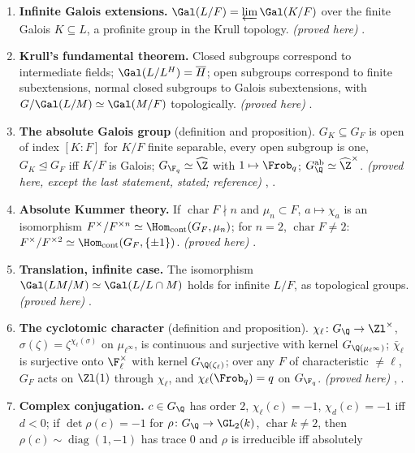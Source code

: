 \begin{enumerate}[label=\textbf{\thechapter.\arabic*}]
.
\item \textbf{Infinite Galois extensions.} $\Gal(L/F)=\varprojlim\Gal(K/F)$ over the finite Galois $K\subseteq L$, a profinite group in the Krull
topology. \emph{(proved here)} .
\item \textbf{Krull's fundamental theorem.} Closed subgroups correspond to intermediate fields; $\Gal(L/L^H)=\overline H$; open subgroups correspond to
finite subextensions, normal closed subgroups to Galois subextensions, with $G/\Gal(L/M)\simeq\Gal(M/F)$ topologically. \emph{(proved here)} .
\item \textbf{The absolute Galois group} (definition and proposition). $G_K\subseteq G_F$ is open of index $[K:F]$ for $K/F$ finite separable, every open
subgroup is one, $G_K\trianglelefteq G_F$ iff $K/F$ is Galois; $G_{\F_q}\simeq\widehat\Z$ with $1\mapsto\Frob_q$; $G_\Q^{\mathrm{ab}}\simeq\widehat\Z^\times$.
\emph{(proved here, except the last statement, stated; reference)} , .
\item \textbf{Absolute Kummer theory.} If $\operatorname{char}F\nmid n$ and $\mu_n\subset F$, $a\mapsto\chi_a$ is an isomorphism $F^\times/F^{\times n}\simeq
\Hom_{\mathrm{cont}}(G_F,\mu_n)$; for $n=2$, $\operatorname{char}F\ne2$: $F^\times/F^{\times2}\simeq\Hom_{\mathrm{cont}}(G_F,\{\pm1\})$. \emph{(proved here)}
.
\item \textbf{Translation, infinite case.} The isomorphism $\Gal(LM/M)\simeq\Gal(L/L\cap M)$ holds for infinite $L/F$, as topological groups.
\emph{(proved here)} .
\item \textbf{The cyclotomic character} (definition and proposition). $\chi_\ell\colon G_\Q\to\Zl^\times$, $\sigma(\zeta)=\zeta^{\chi_\ell(\sigma)}$ on
$\mu_{\ell^\infty}$, is continuous and surjective with kernel $G_{\Q(\mu_{\ell^\infty})}$; $\bar\chi_\ell$ is surjective onto $\F_\ell^\times$ with kernel
$G_{\Q(\zeta_\ell)}$; over any $F$ of characteristic $\ne\ell$, $G_F$ acts on $\Zl(1)$ through $\chi_\ell$, and $\chi_\ell(\Frob_q)=q$ on $G_{\F_q}$.
\emph{(proved here)} , .
\item \textbf{Complex conjugation.} $c\in G_\Q$ has order $2$, $\chi_\ell(c)=-1$, $\chi_d(c)=-1$ iff $d<0$; if $\det\rho(c)=-1$ for
$\rho\colon G_\Q\to\GL_2(k)$, $\operatorname{char}k\ne2$, then $\rho(c)\sim\operatorname{diag}(1,-1)$ has trace $0$ and $\rho$ is irreducible iff absolutely

\end{enumerate}
